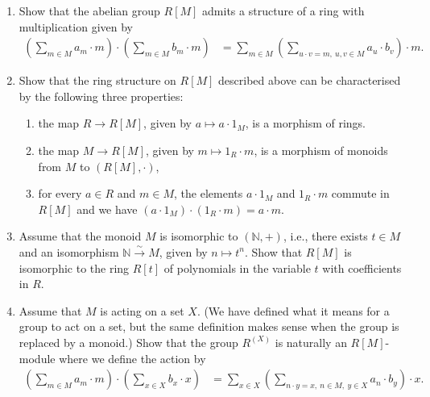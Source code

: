 \documentclass[12pt,a4paper]{article}
\begin{document}
\begin{enumerate}
\renewcommand{\labelenumi}{(\arabic{enumi})}
\item Show that the abelian group $R[M]$ admits a structure of a ring with
multiplication given by
\begin{align*}
\left(\sum_{m\in M}a_m\cdot m\right)\cdot
\left(\sum_{m\in M}b_m\cdot m\right)
&=\sum_{m\in M}\left(\sum_{u\cdot v=m,\ u,v\in M}a_u\cdot b_v\right)\cdot m.
\end{align*}
\item Show that the ring structure on $R[M]$ described above can be characterised
by the following three properties:
  \begin{enumerate}
  \renewcommand{\labelenumii}{(\alph{enumii})}
  \item the map $R\to R[M]$, given by $a\mapsto a\cdot 1_M$, is a morphism of rings.
  \item the map $M\to R[M]$, given by $m\mapsto 1_R\cdot m$, is a morphism
  of monoids from $M$ to $(R[M],\cdot)$,
  \item for every $a\in R$ and $m\in M$, the elements $a\cdot 1_M$ and
  $1_R\cdot m$ commute in $R[M]$ and we have
  $(a\cdot 1_M)\cdot(1_R\cdot m)=a\cdot m$.
  \end{enumerate}
\item Assume that the monoid $M$ is isomorphic to $(\mathbb{N},+)$, i.e.,
there exists $t\in M$ and an isomorphism $\mathbb{N}\xrightarrow{\sim}M$,
given by $n\mapsto t^n$. Show that $R[M]$ is isomorphic to the ring $R[t]$
of polynomials in the variable $t$ with coefficients in $R$.
\item Assume that $M$ is acting on a set $X$. (We have defined what it means
for a group to act on a set, but the same definition makes sense when the
group is replaced by a monoid.) Show that the group $R^{(X)}$ is naturally
an $R[M]$-module where we define the action by
\begin{align*}
\left(\sum_{m\in M}a_m\cdot m\right)\cdot
\left(\sum_{x\in X}b_x\cdot x\right)
&=\sum_{x\in X}\left(\sum_{n\cdot y=x,\ n\in M,\ y\in X}a_n\cdot b_y\right)\cdot x.
\end{align*}
\end{enumerate}
\end{document}
